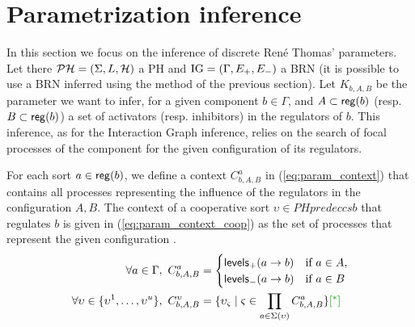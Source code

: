 \section{Parametrization inference}



In this section we focus on the inference of discrete René Thomas' parameters.
Let there $\mathcal{PH} = (\Sigma,L,\mathcal{H})$ a PH and $\mathrm{IG} = (\Gamma,E_+,E_-)$ a BRN (it is possible to use a BRN inferred using the method of the previous section).
Let $K_{b,A,B}$ be the parameter we want to infer, for a given component $b \in \Gamma$, and $A \subset \mathsf{reg}({b})$ (resp. $B \subset \mathsf{reg}({b})$) a set of activators (resp. inhibitors) in the regulators of $b$. This inference, as for the Interaction Graph inference, relies on the search of focal processes of the component for the given configuration of its regulators.

For each sort $a \in \mathsf{reg}({b})$, we define a context $C^a_{b,A,B}$ in (\ref{eq:param_context}) that contains all processes representing the influence of the regulators in the configuration $A,B$. The context of a cooperative sort $\upsilon \in PHpredeccs{b}$ that regulates $b$ is given in (\ref{eq:param_context_coop}) as the set of processes that represent the given configuration .
\begin{align}
\label{eq:param_context}
\forall a\in\Gamma,~
C_{b,A,B}^a & = \begin{cases}
\levelsA{a}{b} & \text{if $a \in A$,}\\
\levelsI{a}{b} & \text{if $a \in B$}
\end{cases}
\\
\label{eq:param_context_coop}
\forall \upsilon \in \{\upsilon^1, \dots, \upsilon^u\},~
C_{b,A,B}^\upsilon & = \{
\upsilon_\varsigma \mid \varsigma \in \prod_{a \in \Sigma(\upsilon)}C_{b,A,B}^a \} \todo{^*}
\end{align}

